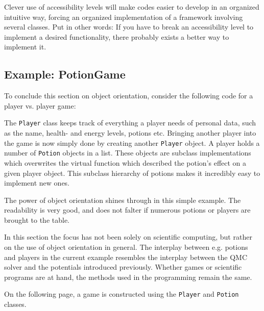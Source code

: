 Clever use of accessibility levels will make codes easier to develop in an organized intuitive way, forcing an organized implementation of a framework involving several classes. Put in other words: If you have to break an accessibility level to implement a desired functionality, there probably exists a better way to implement it.


\subsection{Example: PotionGame}
\label{sec:PotionGame}

To conclude this section on object orientation, consider the following code for a player vs. player game:
\clearpage

\vspace{0.5 cm}

\clearpage


The \verb+Player+ class keeps track of everything a player needs of personal data, such as the name, health- and  energy levels, potions etc. Bringing another player into the game is now simply done by creating another \verb+Player+ object. A player holds a number of \verb+Potion+ objects in a list. These objects are subclass implementations which overwrites the virtual function which described the potion's effect on a given player object. This subclass hierarchy of potions makes it incredibly easy to implement new ones.

The power of object orientation shines through in this simple example. The readability is very good, and does not falter if numerous potions or players are brought to the table.

In this section the focus has not been solely on scientific computing, but rather on the use of object orientation in general. The interplay between e.g. potions and players in the current example resembles the interplay between the QMC solver and the potentials introduced previously. Whether games or scientific programs are at hand, the methods used in the programming remain the same. 

On the following page, a game is constructed using the \verb+Player+ and \verb+Potion+ classes. 
 
\clearpage


